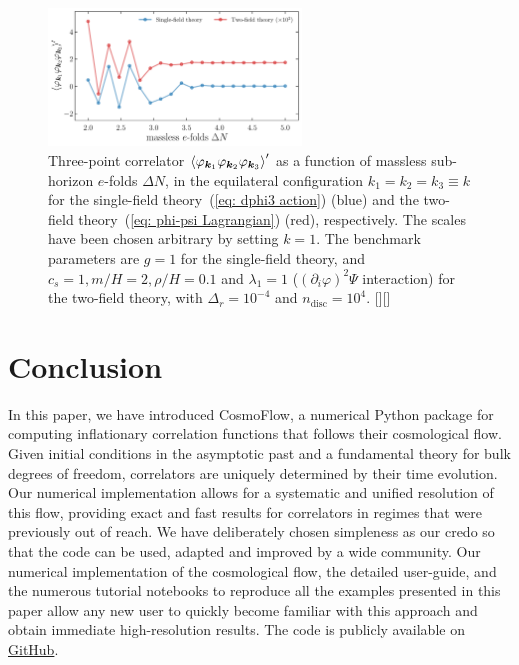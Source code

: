 \documentclass[11pt]{article}
\numberwithin{equation}{section} %
\begin{document}
\begin{figure}[h!]
  \centering
  \includegraphics[width=0.6\textwidth]{Figures/Performances_convergence.pdf}
  \vspace*{0.2cm}
  \caption{Three-point correlator $\braket{\varphi_{\bm{k}_1} \varphi_{\bm{k}_2} \varphi_{\bm{k}_3}}'$ as a function of massless sub-horizon $e$-folds $\Delta N$, in the equilateral configuration $k_1=k_2=k_3\equiv k$ for the single-field theory~(\ref{eq: dphi3 action}) (\textcolor{pyblue}{blue}) and the two-field theory~(\ref{eq: phi-psi Lagrangian}) (\textcolor{pyred}{red}), respectively. The scales have been chosen arbitrary by setting $k=1$. The benchmark parameters are $g=1$ for the single-field theory, and $c_s=1, m/H = 2, \rho/H = 0.1$ and $\lambda_1 = 1$ ($(\partial_i \varphi)^2\Psi$ interaction) for the two-field theory, with $\Delta_r = 10^{-4}$ and $n_{\text{disc}} = 10^4$. [\href{https://github.com/deniswerth/CosmoFlow/blob/main/CosmoFlow/PhiPsi/Performances.ipynb}{\faGithub}][\href{https://github.com/deniswerth/CosmoFlow/blob/main/CosmoFlow/Massless_dphi3/Performances.ipynb}{\faGithub}]}
  \label{fig: Convergence}
\end{figure}


\section{Conclusion}
\label{sec: Conclusion}

In this paper, we have introduced \textsf{CosmoFlow}, a numerical Python package for computing inflationary correlation functions that follows their cosmological flow. Given initial conditions in the asymptotic past and a fundamental theory for bulk degrees of freedom, correlators are uniquely determined by their time evolution. Our numerical implementation allows for a systematic and unified resolution of this flow, providing exact and fast results for correlators in regimes that were previously out of reach. We have deliberately chosen simpleness as our credo so that the code can be used, adapted and improved by a wide community. Our numerical implementation of the cosmological flow, the detailed user-guide, and the numerous tutorial notebooks to reproduce all the examples presented in this paper allow any new user to quickly become familiar with this approach and obtain immediate high-resolution results. The code is publicly available on \href{https://github.com/deniswerth/CosmoFlow}{GitHub}.
\end{document}
